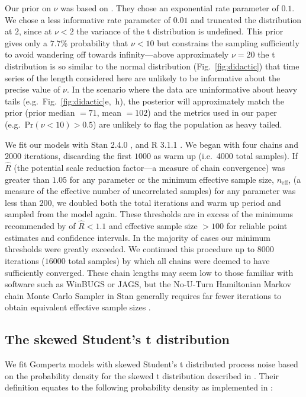 Our prior on $\nu$ was based on \citet{fernandez1998}. They chose an
exponential rate parameter of $0.1$. We chose a less informative rate
parameter of $0.01$ and truncated the distribution at $2$, since at $\nu < 2$
the variance of the t distribution is undefined. This prior gives only a
$7.7$\% probability that $\nu < 10$ but constrains the sampling sufficiently
to avoid wandering off towards infinity---above approximately $\nu = 20$ the t
distribution is so similar to the normal distribution
(Fig.~\ref{fig:didactic}) that time series of the length considered here are
unlikely to be informative about the precise value of $\nu$. In the scenario
where the data are uninformative about heavy tails
(e.g.~Fig.~\ref{fig:didactic}e,~h), the posterior will approximately match the
prior (prior median $= 71$, mean $= 102$) and the metrics used in our paper
(e.g.~Pr$(\nu < 10) > 0.5$) are unlikely to flag the population as heavy
tailed.

We fit our models with Stan 2.4.0 \citep{stan-manual2014}, and R 3.1.1
\citep{r2014}. We began with four chains and $2000$ iterations, discarding the
first $1000$ as warm up (i.e.~4000 total samples). If $\hat{R}$ (the potential
scale reduction factor---a measure of chain convergence) was greater than
$1.05$ for any parameter or the minimum effective sample size,
$n_\mathrm{eff}$, (a measure of the effective number of uncorrelated samples)
for any parameter was less than $200$, we doubled both the total iterations
and warm up period and sampled from the model again. These thresholds are in
excess of the minimums recommended by \citet{gelman2006a} of $\hat{R} < 1.1$
and effective sample size $> 100$ for reliable point estimates and confidence
intervals. In the majority of cases our minimum thresholds were greatly
exceeded. We continued this procedure up to $8000$ iterations ($16000$ total
samples) by which all chains were deemed to have sufficiently converged. These
chain lengths may seem low to those familiar with software such as WinBUGS or
JAGS, but the No-U-Turn Hamiltonian Markov chain Monte Carlo Sampler in Stan
generally requires far fewer iterations to obtain equivalent effective sample
sizes \citep{stan-manual2014}.

\subsection{The skewed Student's t distribution}

We fit Gompertz models with skewed Student's t distributed process noise based
on the probability density for the skewed t distribution described in
\citet{fernandez1998}. Their definition equates to the following probability density as implemented in \citet{king2012}:

